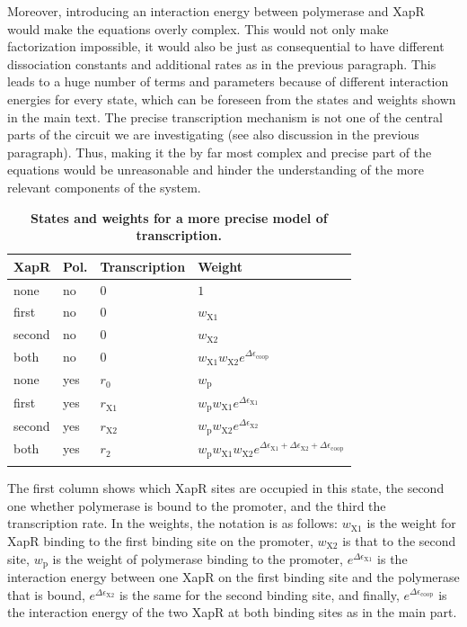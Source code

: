 \documentclass[10pt,letterpaper]{article}
\newlength\savedwidth
\newcommand\thickhline{\noalign{\global\savedwidth\arrayrulewidth\global\arrayrulewidth 2pt}%
	\hline
	\noalign{\global\arrayrulewidth\savedwidth}}
\newcommand{\n}[1]{\mathrm{#1}}
\begin{document}
Moreover, introducing an interaction energy between polymerase and XapR would make the equations overly complex. This would not only make factorization impossible, it would also be just as consequential to have different dissociation constants and additional rates as in the previous paragraph. This leads to a huge number of terms and parameters because of different interaction energies for every state, which can be foreseen from the states and weights shown in the main text. The precise transcription mechanism is not one of the central parts of the circuit we are investigating (see also discussion in the previous paragraph). Thus, making it the by far most complex and precise part of the equations would be unreasonable and hinder the understanding of the more relevant components of the system.

\begin{table}
	\centering
	\caption{
		{\bf States and weights for a more precise model of transcription.}}
	\begin{tabular}{llll}
		\thickhline
		XapR & Pol. & Transcription & Weight \\
		\hline
		none & no & $0$ & $1$ \\
		first & no & $0$ & $w_{\n{X1}}$ \\
		second & no & $0$ & $w_{\n{X2}}$ \\
		both & no & $0$ & $w_{\n{X1}} w_{\n{X2}} e^{\Delta \epsilon_{\n{coop}}}$ \\
		none & yes & $r_0$ & $w_{\n{p}}$ \\
		first & yes & $r_{\n{X1}}$ & $w_{\n{p}} w_{\n{X1}} e^{\Delta \epsilon_{\n{X1}}}$ \\
		second & yes & $r_{\n{X2}}$ & $w_{\n{p}} w_{\n{X2}} e^{\Delta \epsilon_{\n{X2}}}$ \\
		both & yes & $r_2$ & $w_{\n{p}} w_{\n{X1}} w_{\n{X2}} e^{\Delta \epsilon_{\n{X1}} + \Delta \epsilon_{\n{X2}} + \Delta \epsilon_{\n{coop}}}$ \\
		\thickhline
	\end{tabular}
	\begin{flushleft} 
		The first column shows which XapR sites are occupied in this state, the second one whether polymerase is bound to the promoter, and the third the transcription rate. In the weights, the notation is as follows: $w_{\n{X1}}$ is the weight for XapR binding to the first binding site on the promoter, $w_{\n{X2}}$ is that to the second site, $w_{\n{p}}$ is the weight of polymerase binding to the promoter, $e^{\Delta \epsilon_{\n{X1}}}$ is the interaction energy between one XapR on the first binding site and the polymerase that is bound, $e^{\Delta \epsilon_{\n{X2}}}$ is the same for the second binding site, and finally, $e^{\Delta \epsilon_{\n{coop}}}$ is the interaction energy of the two XapR at both binding sites as in the main part.
	\end{flushleft}
	\label{tableSI1:statesPromoter}
\end{table}
\end{document}
